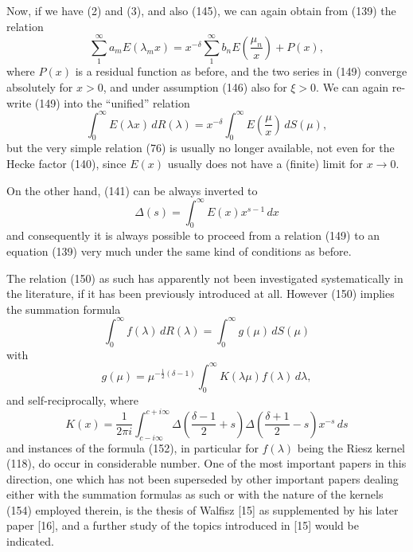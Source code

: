 \documentclass[12pt]{article}
\begin{document}
Now, if we have (2) and (3), and also (145), we can again obtain from (139) the relation
\begin{equation}
\sum_1^{\infty} a_m E(\lambda_m x) = x^{-\delta} \sum_1^{\infty} b_n E \left( \frac{\mu_n}{x} \right) + P(x),
\tag{149}
\end{equation}
where \(P(x)\) is a residual function as before, and the two series in (149) converge absolutely for \(x > 0\), and under assumption (146) also for \(\xi > 0\). We can again re-write (149) into the ``unified'' relation
\begin{equation}
\int_0^{\infty} E(\lambda x) \, dR(\lambda) = x^{-\delta} \int_0^{\infty} E \left( \frac{\mu}{x} \right) \, dS(\mu),
\tag{150}
\end{equation}
but the very simple relation (76) is usually no longer available, not even for the Hecke factor (140), since \(E(x)\) usually does not have a (finite) limit for \(x \to 0\).

On the other hand, (141) can be always inverted to
\begin{equation}
\Delta(s) = \int_0^{\infty} E(x)x^{s-1} \, dx
\tag{151}
\end{equation}
and consequently it is always possible to proceed from a relation (149) to an equation (139) very much under the same kind of conditions as before.

The relation (150) as such has apparently not been investigated systematically in the literature, if it has been previously introduced at all. However (150) implies the summation formula
\begin{equation}
\int_0^{\infty} f(\lambda) \, dR(\lambda) = \int_0^{\infty} g(\mu) \, dS(\mu)
\tag{152}
\end{equation}
with
\begin{equation}
g(\mu) = \mu^{-\frac{1}{2}(\delta-1)} \int_0^{\infty} K(\lambda\mu) f(\lambda) \, d\lambda,
\tag{153}
\end{equation}
and self-reciprocally, where
\begin{equation}
K(x) = \frac{1}{2\pi i} \int_{c-i\infty}^{c+i\infty} \Delta \left( \frac{\delta-1}{2} + s \right) \Delta \left( \frac{\delta+1}{2} - s \right) x^{-s} \, ds
\tag{154}
\end{equation}
and instances of the formula (152), in particular for \(f(\lambda)\) being the Riesz kernel (118), do occur in considerable number. One of the most important papers in this direction, one which has not been superseded by other important papers dealing either with the summation formulas as such or with the nature of the kernels (154) employed therein, is the thesis of Walfisz [15] as supplemented by his later paper [16], and a further study of the topics introduced in [15] would be indicated.
\end{document}
